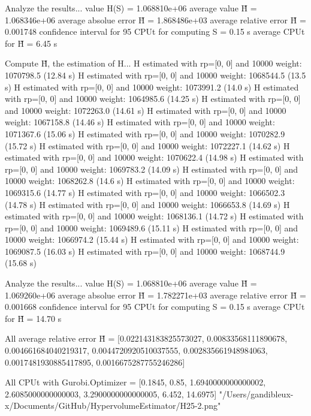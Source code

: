 Analyze the results...
  value H(S)                  = 1.068810e+06 
  average value H̃             = 1.068346e+06 
  average absolue error H̃     = 1.868486e+03 
  average relative error H̃    = 0.001748 
  confidence interval for 95%
  CPUt for computing S         = 0.15 s
  average CPUt for H̃           = 6.45 s

Compute H̃, the estimation of H...
  H estimated with rp=[0, 0] and 10000 weight:  1070798.5  (12.84 s)
  H estimated with rp=[0, 0] and 10000 weight:  1068544.5  (13.5 s)
  H estimated with rp=[0, 0] and 10000 weight:  1073991.2  (14.0 s)
  H estimated with rp=[0, 0] and 10000 weight:  1064985.6  (14.25 s)
  H estimated with rp=[0, 0] and 10000 weight:  1072263.0  (14.61 s)
  H estimated with rp=[0, 0] and 10000 weight:  1067158.8  (14.46 s)
  H estimated with rp=[0, 0] and 10000 weight:  1071367.6  (15.06 s)
  H estimated with rp=[0, 0] and 10000 weight:  1070282.9  (15.72 s)
  H estimated with rp=[0, 0] and 10000 weight:  1072227.1  (14.62 s)
  H estimated with rp=[0, 0] and 10000 weight:  1070622.4  (14.98 s)
  H estimated with rp=[0, 0] and 10000 weight:  1069783.2  (14.09 s)
  H estimated with rp=[0, 0] and 10000 weight:  1068262.8  (14.6 s)
  H estimated with rp=[0, 0] and 10000 weight:  1069315.6  (14.77 s)
  H estimated with rp=[0, 0] and 10000 weight:  1066502.3  (14.78 s)
  H estimated with rp=[0, 0] and 10000 weight:  1066653.8  (14.69 s)
  H estimated with rp=[0, 0] and 10000 weight:  1068136.1  (14.72 s)
  H estimated with rp=[0, 0] and 10000 weight:  1069489.6  (15.11 s)
  H estimated with rp=[0, 0] and 10000 weight:  1066974.2  (15.44 s)
  H estimated with rp=[0, 0] and 10000 weight:  1069087.5  (16.03 s)
  H estimated with rp=[0, 0] and 10000 weight:  1068744.9  (15.68 s)

Analyze the results...
  value H(S)                  = 1.068810e+06 
  average value H̃             = 1.069260e+06 
  average absolue error H̃     = 1.782271e+03 
  average relative error H̃    = 0.001668 
  confidence interval for 95%
  CPUt for computing S         = 0.15 s
  average CPUt for H̃           = 14.70 s

All average relative error H̃ = [0.022143183825573027, 0.00833568111890678, 0.004661684040219317, 0.0044720920510037555, 0.002835661948984063, 0.0017481930885417895, 0.0016675287755246286]

All CPUt with Gurobi.Optimizer = [0.1845, 0.85, 1.6940000000000002, 2.6085000000000003, 3.2900000000000005, 6.452, 14.6975]
"/Users/gandibleux-x/Documents/GitHub/HypervolumeEstimator/H25-2.png"

